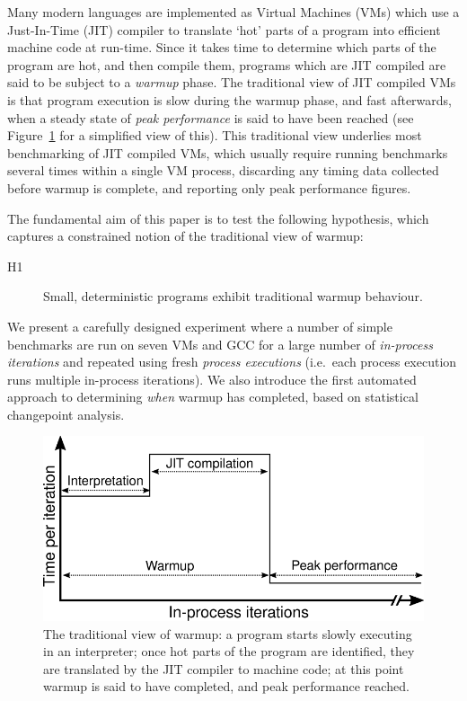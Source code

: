 \documentclass[preprint,numbers,10pt]{sigplanconf}
\newcommand{\hypone}{H1\xspace}
\begin{document}
Many modern languages are implemented as Virtual Machines (VMs) which use a
Just-In-Time (JIT) compiler to translate `hot' parts of a program into efficient
machine code at run-time. Since it takes time to determine which parts of the
program are hot, and then compile them, programs which are JIT compiled are
said to be subject to a \emph{warmup} phase. The traditional view of
JIT compiled VMs is that program execution is slow during the warmup phase, and
fast afterwards, when a steady state of \emph{peak performance} is said to have been reached
(see Figure~\ref{fig:trad} for a simplified view of this).
This traditional view underlies most benchmarking of JIT compiled VMs, which
usually require running benchmarks several times within a single VM process,
discarding any timing data collected before warmup is complete, and
reporting only peak performance figures.

The fundamental aim of this paper is to test the following hypothesis, which captures a constrained
notion of the traditional view of warmup:
\begin{description}
  \item[\hypone] Small, deterministic programs exhibit traditional warmup behaviour.
\end{description}
We present a carefully designed
experiment where a number of simple benchmarks are run on seven
VMs and GCC for a large number of \emph{in-process iterations} and repeated using fresh
\emph{process executions} (i.e.~each process execution runs multiple in-process
iterations). We also introduce the first automated approach to determining
\emph{when} warmup has completed, based on statistical changepoint analysis.

\begin{figure}[t]
\centering
\includegraphics[width=.475\textwidth]{img/picturebook_warmup}
\caption{The traditional view of warmup: a program starts slowly executing in
an interpreter; once hot parts of the program are identified, they are
translated by the JIT compiler to machine code; at this point warmup
is said to have completed, and peak performance reached.}
\label{fig:trad}
\end{figure}
\end{document}
